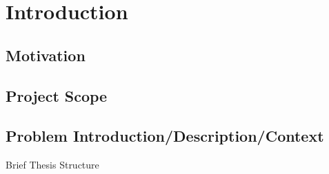 \section{Introduction}
\label{sec:intro}


\subsection{Motivation}


\subsection{Project Scope}


\subsection{Problem Introduction/Description/Context}


Brief Thesis Structure
\clearpage
